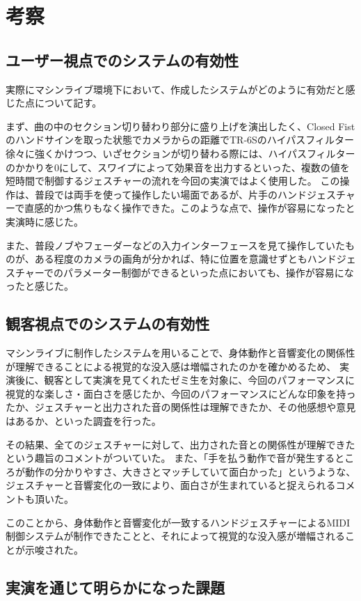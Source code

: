 \section{考察}
\subsection{ユーザー視点でのシステムの有効性}
実際にマシンライブ環境下において、作成したシステムがどのように有効だと感じた点について記す。

まず、曲の中のセクション切り替わり部分に盛り上げを演出したく、Closed Fistのハンドサインを取った状態でカメラからの距離でTR-6Sのハイパスフィルター徐々に強くかけつつ、いざセクションが切り替わる際には、ハイパスフィルターのかかりを0にして、スワイプによって効果音を出力するといった、複数の値を短時間で制御するジェスチャーの流れを今回の実演ではよく使用した。
この操作は、普段では両手を使って操作したい場面であるが、片手のハンドジェスチャーで直感的かつ焦りもなく操作できた。このような点で、操作が容易になったと実演時に感じた。

また、普段ノブやフェーダーなどの入力インターフェースを見て操作していたものが、ある程度のカメラの画角が分かれば、特に位置を意識せずともハンドジェスチャーでのパラメーター制御ができるといった点においても、操作が容易になったと感じた。

\subsection{観客視点でのシステムの有効性}
マシンライブに制作したシステムを用いることで、身体動作と音響変化の関係性が理解できることによる視覚的な没入感は増幅されたのかを確かめるため、
実演後に、観客として実演を見てくれたゼミ生を対象に、今回のパフォーマンスに視覚的な楽しさ・面白さを感じたか、今回のパフォーマンスにどんな印象を持ったか、ジェスチャーと出力された音の関係性は理解できたか、その他感想や意見はあるか、といった調査を行った。

その結果、全てのジェスチャーに対して、出力された音との関係性が理解できたという趣旨のコメントがついていた。
また、「手を払う動作で音が発生するところが動作の分かりやすさ、大きさとマッチしていて面白かった」というような、ジェスチャーと音響変化の一致により、面白さが生まれていると捉えられるコメントも頂いた。

このことから、身体動作と音響変化が一致するハンドジェスチャーによるMIDI制御システムが制作できたことと、それによって視覚的な没入感が増幅されることが示唆された。

\subsection{実演を通じて明らかになった課題}

